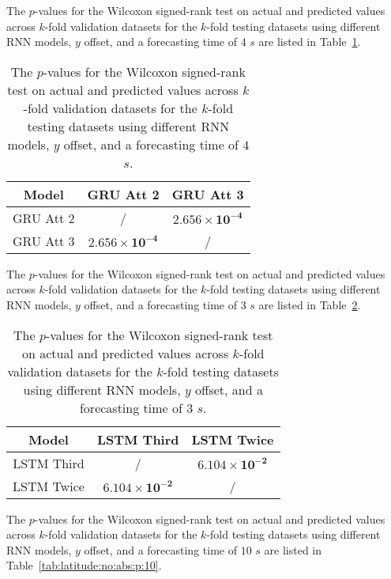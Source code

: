 The $p$-values for the Wilcoxon signed-rank test on actual and predicted values across $k$-fold validation datasets for the $k$-fold testing datasets using different RNN models, $y$ offset, and a forecasting time of $4$ $s$ are listed in Table~\ref{tab:latitude:no:abs:p:4}.

\begin{table}[!ht]
	\centering
	\begin{tabular}{|c|c|c|}
		\hline
		Model & GRU Att 2 & GRU Att 3 \\ \hline
		GRU Att 2 & / & $\mathbf{2.656 \times 10^{-4}}$ \\ \hline
		GRU Att 3 & $\mathbf{2.656 \times 10^{-4}}$ & / \\ \hline
	\end{tabular}
	\caption{The $p$-values for the Wilcoxon signed-rank test on actual and predicted values across $k$-fold validation datasets for the $k$-fold testing datasets using different RNN models, $y$ offset, and a forecasting time of $4$ $s$.}
	\label{tab:latitude:no:abs:p:4}
\end{table}

The $p$-values for the Wilcoxon signed-rank test on actual and predicted values across $k$-fold validation datasets for the $k$-fold testing datasets using different RNN models, $y$ offset, and a forecasting time of $3$ $s$ are listed in Table~\ref{tab:latitude:no:abs:p:3}.

\begin{table}[!ht]
	\centering
	\begin{tabular}{|c|c|c|}
		\hline
		Model & LSTM Third & LSTM Twice \\ \hline
		LSTM Third & / & $\mathbf{6.104 \times 10^{-2}}$ \\ \hline
		LSTM Twice & $\mathbf{6.104 \times 10^{-2}}$ & / \\ \hline
	\end{tabular}
	\caption{The $p$-values for the Wilcoxon signed-rank test on actual and predicted values across $k$-fold validation datasets for the $k$-fold testing datasets using different RNN models, $y$ offset, and a forecasting time of $3$ $s$.}
	\label{tab:latitude:no:abs:p:3}
\end{table}

The $p$-values for the Wilcoxon signed-rank test on actual and predicted values across $k$-fold validation datasets for the $k$-fold testing datasets using different RNN models, $y$ offset, and a forecasting time of $10$ $s$ are listed in Table~\ref{tab:latitude:no:abs:p:10}.

